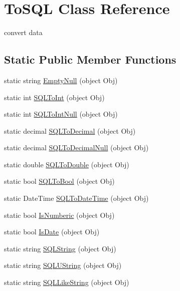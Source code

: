 \hypertarget{class_to_s_q_l}{\section{To\-S\-Q\-L Class Reference}
\label{class_to_s_q_l}
}


convert data  


\subsection*{Static Public Member Functions}
\begin{DoxyCompactItemize}
\item 
static string \hyperlink{class_to_s_q_l_a924feba5689640b9260c7ff4d4da2df3}{Empty\-Null} (object Obj)
\item 
static int \hyperlink{class_to_s_q_l_a84a04e64766978cecdba0eaeb6252f80}{S\-Q\-L\-To\-Int} (object Obj)
\item 
static int \hyperlink{class_to_s_q_l_a861e05fe50c8425d6a3f964fc2c45299}{S\-Q\-L\-To\-Int\-Null} (object Obj)
\item 
static decimal \hyperlink{class_to_s_q_l_ad872e7782e533bfea0c3fcc64214b4e0}{S\-Q\-L\-To\-Decimal} (object Obj)
\item 
static decimal \hyperlink{class_to_s_q_l_afdaef8db307e9ae4a543a9dcc6e700a0}{S\-Q\-L\-To\-Decimal\-Null} (object Obj)
\item 
static double \hyperlink{class_to_s_q_l_a1bd370378625d1fc19ee47b35d29b2d3}{S\-Q\-L\-To\-Double} (object Obj)
\item 
static bool \hyperlink{class_to_s_q_l_abea8cc7efc15e6ed898c47300709d56b}{S\-Q\-L\-To\-Bool} (object Obj)
\item 
static Date\-Time \hyperlink{class_to_s_q_l_a5c0dc88c118676c5f4c581b4434dc45a}{S\-Q\-L\-To\-Date\-Time} (object Obj)
\item 
static bool \hyperlink{class_to_s_q_l_a0f8d0c3fed178000d9f29a1ed046caa4}{Is\-Numberic} (object Obj)
\item 
static bool \hyperlink{class_to_s_q_l_a5ea5080d0c22668757d8289f8426e219}{Is\-Date} (object Obj)
\item 
static string \hyperlink{class_to_s_q_l_a125bc678eb4a1342a78ce05baa97c218}{S\-Q\-L\-String} (object Obj)
\item 
static string \hyperlink{class_to_s_q_l_ad5faed3305f877b3dc46360cadd93add}{S\-Q\-L\-U\-String} (object Obj)
\item 
static string \hyperlink{class_to_s_q_l_aded0150550c536d79ecbb7da1fa71022}{S\-Q\-L\-Like\-String} (object Obj)

\end{DoxyCompactItemize}
